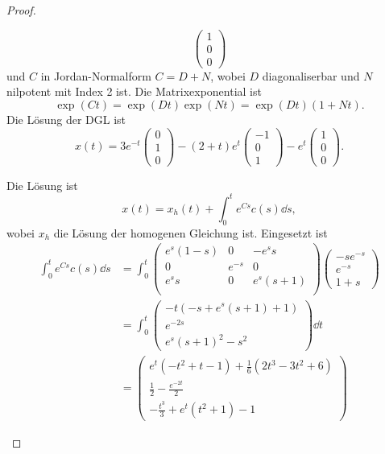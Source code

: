 \begin{proof}
\begin{parts}
\begin{enumerate}[label=\roman*)]
\[\begin{pmatrix}
1 \\ 0 \\ 0
\end{pmatrix}\]
und $C$ in Jordan-Normalform $C=D+N$, wobei $D$ diagonaliserbar und $N$ nilpotent mit Index 2 ist. Die Matrixexponential ist
\[\exp(C t)= \exp(Dt)\exp(N t)=\exp(D t)(1+Nt).\]
Die L\"{o}sung der DGL ist
\[x(t)=3e^{-t}\begin{pmatrix}
	0 \\ 1 \\ 0
\end{pmatrix}-(2+t)e^{t}\begin{pmatrix}
-1 \\ 0 \\ 1
\end{pmatrix}-e^t \begin{pmatrix}
1 \\ 0 \\ 0
\end{pmatrix}.\]
		\end{enumerate}
	\item Die L\"{o}sung ist
	\[x(t) = x_h(t)+\int_0^t e^{Cs}c(s)\dd{s},\]
	wobei $x_h$ die L\"{o}sung der homogenen Gleichung ist. Eingesetzt ist
	\begin{align*}
		\int_0^t e^{Cs}c(s)\dd{s}&=\int_0^t \left(
		\begin{array}{ccc}
			e^s (1-s) & 0 & -e^s s \\
			0 & e^{-s} & 0 \\
			e^s s & 0 & e^s (s+1) \\
		\end{array}
		\right)\begin{pmatrix}
			-se^{-s} \\ e^{-s} \\ 1 + s
		\end{pmatrix}\\
	&=\int_0^t \begin{pmatrix}-t \left(-s+e^s (s+1)+1\right) \\e^{-2 s}\\e^s (s+1)^2-s^2\end{pmatrix}\dd{t}\\
	&=\begin{pmatrix}e^t \left(-t^2+t-1\right)+\frac{1}{6} \left(2 t^3-3 t^2+6\right)\\\frac{1}{2}-\frac{e^{-2 t}}{2}\\-\frac{t^3}{3}+e^t \left(t^2+1\right)-1\end{pmatrix}
	\end{align*}

\end{parts}
\end{proof}
